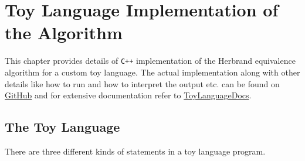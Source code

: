 \chapter{Toy Language Implementation of the Algorithm}
\label{chap:chapter8}

This chapter provides details of \texttt{C++} implementation of the Herbrand 
equivalence algorithm for a custom toy language. The actual implementation along 
with other details like how to run and how to interpret the output etc. can be 
found on \href{https://github.com/himanshu520/HerbrandEquivalence/tree/master/ToyLanguage}{GitHub} 
and for extensive documentation refer to \href{https://himanshu520.github.io/HerbrandEquivalenceToyDocs/}{ToyLanguageDocs}.

\section{The Toy Language}
\label{sec:TheToyLanguage}

There are three different kinds of statements in a toy language program.


